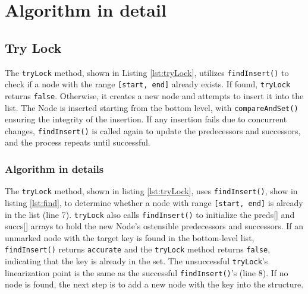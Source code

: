 \section{Algorithm in detail}

\subsection{Try Lock}\label{subsec:tryLock}

The \texttt{tryLock} method, shown in Listing \ref{lst:tryLock}, utilizes \texttt{findInsert()} to check if a node with the range \texttt{[start, end]} already exists. If found, \texttt{tryLock} returns \texttt{false}. Otherwise, it creates a new node and attempts to insert it into the list. The Node is inserted starting from the bottom level, with \texttt{compareAndSet()} ensuring the integrity of the insertion. If any insertion fails due to concurrent changes, \texttt{findInsert()} is called again to update the predecessors and successors, and the process repeats until successful.

\vspace{15pt}

    
\begin{figure}[h]
    \centering
    
\end{figure}

\subsubsection*{Algorithm in details}
The \texttt{tryLock} method, shown in listing \ref{lst:tryLock}, uses \texttt{findInsert()}, show in listing \ref{lst:find}, to determine whether a node with range \texttt{[start, end]} is already in the list (line 7). \texttt{tryLock} also calls \texttt{findInsert()} to initialize the preds[] and succs[] arrays to hold the new Node's ostensible predecessors and successors.
If an unmarked node with the target key is found in the bottom-level list, \texttt{findInsert()} returns \texttt{accurate} and the \texttt{tryLock} method returns \texttt{false}, indicating that the key is already in the set. The unsuccessful \texttt{tryLock}'s linearization point is the same as the successful \texttt{findInsert()}'s (line 8). If no node is found, the next step is to add a new node with the key into the structure.

